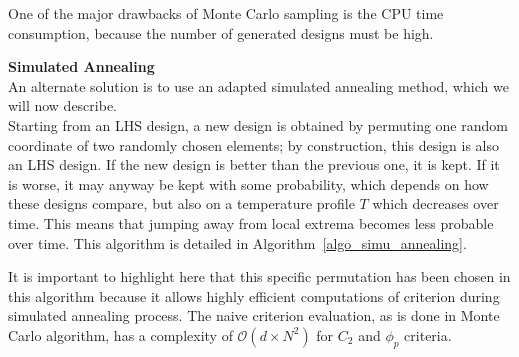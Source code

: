{One of the major drawbacks of Monte Carlo sampling is the CPU time consumption, because the number of generated designs must be high.

{\textbf{Simulated Annealing}}\\
An alternate solution is to use an adapted simulated annealing method, which we will now describe.\\
Starting from an LHS design, a new design is obtained by permuting one random coordinate of two randomly chosen elements; by construction, this design is also an LHS design. If the new design is better than the previous one, it is kept.  If it is worse, it may anyway be kept with some probability, which depends on how these designs compare, but also on a temperature profile $T$ which decreases over time.  This means that jumping away from local extrema becomes less probable over time.
This algorithm is detailed in Algorithm~\ref{algo_simu_annealing}.

It is important to highlight here that this specific permutation has been chosen in this algorithm because it allows highly efficient computations of criterion during simulated annealing process.  The naive criterion evaluation, as is done in Monte Carlo algorithm, has a complexity of $\mathcal{O}(d\times N^2)$ for $C_2$ and $\phi_p$ criteria.


}
